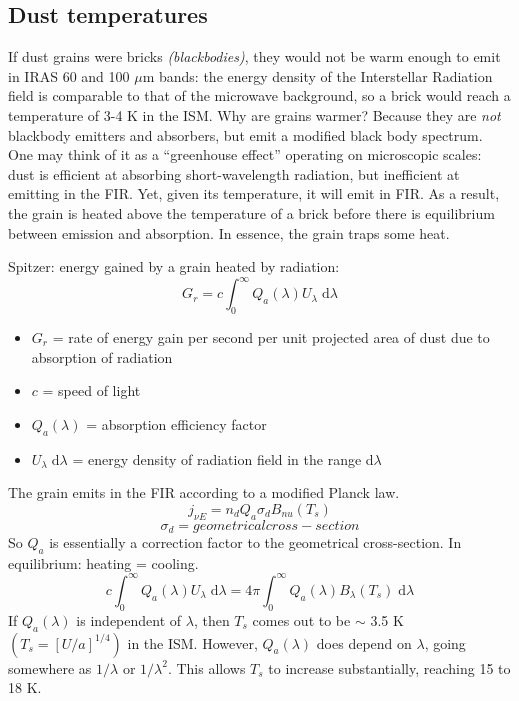 \documentclass[11pt]{article}
\newcommand{\mar}[1]{\hspace{0pt}\marginpar{-\textcolor{black}{#1}-}}
\newcommand{\mynotes}[1]{{\fontfamily{cmss}\selectfont \textit{#1}}}
\begin{document}
\subsection{Dust temperatures}
If dust grains were bricks \mynotes{(blackbodies)}, they would not
be warm enough to emit in IRAS 60 and 100 $\mu$m bands: the energy
density of the Interstellar Radiation field is comparable to that
of the microwave background, so a brick would reach a temperature of
3-4 K in the ISM. Why are grains warmer? Because they are \emph{not}
blackbody emitters and absorbers, but emit a modified black body
spectrum. One may think of it as a ``greenhouse effect''
\mar{110}operating on microscopic scales: dust is efficient at absorbing
short-wavelength radiation, but inefficient at emitting in the FIR.
Yet, given its temperature, it will emit in FIR. As a result, the grain
is heated above the temperature of a brick before there is equilibrium
between emission and absorption. In essence, the grain traps some heat.

Spitzer: energy gained by a grain heated by radiation:
\[
    G_{r} = c \int_{0}^{\infty}{
        Q_{a} (\lambda) U_{\lambda}\; \mathrm{d}\lambda}
    \]
\begin{itemize}
    \item $G_{r}$ = rate of energy gain per second per unit projected
        area of dust due to absorption of radiation
    \item $c$ = speed of light
    \item $Q_{a}(\lambda)$ = absorption efficiency factor
    \item $U_{\lambda}\; \mathrm{d}\lambda$ = energy density of radiation
        field in the range d$\lambda$
\end{itemize}
The grain emits in the FIR according to a modified Planck law.
\[
    j_{{\nu}E} = n_{d} Q_{a} \sigma_{d} B_{nu} (T_{s})
    \]
\[
    \sigma_{d} = geometrical cross-section
    \]
So $Q_{a}$ is essentially a correction factor to the geometrical cross-section.
In equilibrium: heating = cooling.\mar{111}
\[
    c \int_{0}^{\infty}{
        Q_{a} (\lambda) U_{\lambda}\; \mathrm{d}\lambda }
    = 4\pi \int_{0}^{\infty}{
        Q_{a} (\lambda) B_{\lambda} (T_{s})\; \mathrm{d}\lambda }
    \]
If $Q_{a}(\lambda)$ is independent of $\lambda$, then $T_{s}$ comes out
to be $\sim$ 3.5 K $ (T_{s} = [U/a]^{1/4} ) $ in the ISM.
However, $Q_{a}(\lambda)$ does depend on $\lambda$, going somewhere
as $1/\lambda$ or $1/\lambda^{2}$. This allows $T_{s}$ to increase
substantially, reaching 15 to 18 K.
\end{document}
